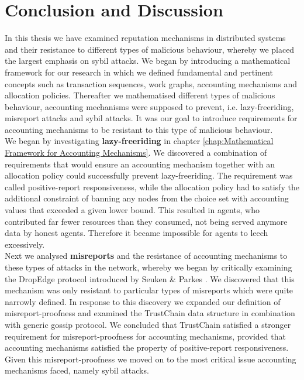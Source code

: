 \chapter{Conclusion and Discussion}
\label{chap:Conclusion and Discussion}

\noindent{}In this thesis we have examined reputation mechanisms in distributed systems and their resistance to different types of malicious behaviour, whereby we placed the largest emphasis on sybil attacks. We began by introducing a mathematical framework for our research in which we defined fundamental and pertinent concepts such as transaction sequences, work graphs, accounting mechanisms and allocation policies. Thereafter we mathematised different types of malicious behaviour, accounting mechanisms were supposed to prevent, i.e. lazy-freeriding, misreport attacks and sybil attacks. It was our goal to introduce requirements for accounting mechanisms to be resistant to this type of malicious behaviour. \vspace{1em}\\	


\noindent{}We began by investigating \textbf{lazy-freeriding} in chapter \ref{chap:Mathematical Framework for Accounting Mechanisms}. We discovered a combination of requirements that would ensure an accounting mechanism together with an allocation policy could successfully prevent lazy-freeriding. The requirement was called positive-report responsiveness, while the allocation policy had to satisfy the additional constraint of banning any nodes from the choice set with accounting values that exceeded a given lower bound. This resulted in agents, who contributed far fewer resources than they consumed, not being served anymore data by honest agents. Therefore it became impossible for agents to leech excessively.\vspace{1em}\\ 

\noindent{}Next we analysed \textbf{misreports} and the resistance of accounting mechanisms to these types of attacks in the network, whereby we began by critically examining the DropEdge protocol introduced by Seuken \& Parkes \cite{Sybil-proof Accounting Mechanisms with Transitive Trust}. We discovered that this mechanism was only resistant to particular types of misreports which were quite narrowly defined. In response to this discovery we expanded our definition of misreport-proofness and examined the TrustChain data structure in combination with generic gossip protocol. We concluded that TrustChain satisfied a stronger requirement for misreport-proofness for accounting mechanisms, provided that accounting mechanisms satisfied the property of positive-report responsiveness. Given this misreport-proofness we moved on to the most critical issue accounting mechanisms faced, namely sybil attacks. \vspace{1em}\\


